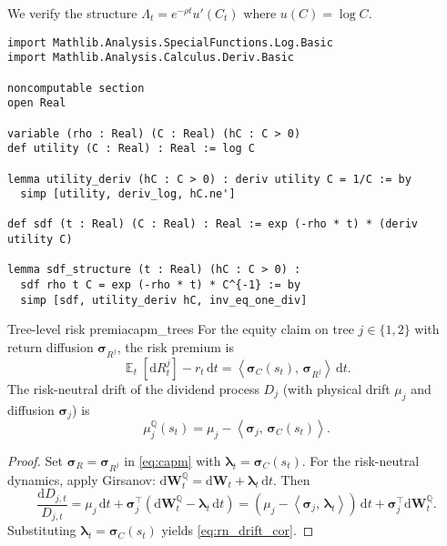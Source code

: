 ﻿\documentclass[11pt,letterpaper,oneside]{article}
\numberwithin{equation}{section}
\DeclareMathOperator{\E}{\mathbb{E}}
\newcommand{\1}{\mathbf{1}}
\newcommand{\diff}{\mathrm{d}}
\newcommand{\ip}[2]{\left\langle #1,\,#2\right\rangle}
\begin{document}
\begin{leanproof}[title={Structural Definition: Log-Utility SDF}]
We verify the structure $\Lambda_t = e^{-\rho t} u'(C_t)$ where $u(C) = \log C$.
\begin{lstlisting}[language={},basicstyle=\ttfamily\small]
import Mathlib.Analysis.SpecialFunctions.Log.Basic
import Mathlib.Analysis.Calculus.Deriv.Basic

noncomputable section
open Real

variable (rho : Real) (C : Real) (hC : C > 0)
def utility (C : Real) : Real := log C

lemma utility_deriv (hC : C > 0) : deriv utility C = 1/C := by
  simp [utility, deriv_log, hC.ne']

def sdf (t : Real) (C : Real) : Real := exp (-rho * t) * (deriv utility C)

lemma sdf_structure (t : Real) (hC : C > 0) :
  sdf rho t C = exp (-rho * t) * C^{-1} := by
  simp [sdf, utility_deriv hC, inv_eq_one_div]
\end{lstlisting}
\end{leanproof}

\begin{corollary}{Tree-level risk premia}{capm_trees}
For the equity claim on tree $j\in\{1,2\}$ with return diffusion $\bm{\sigma}_{R^j}$, the risk premium is
\begin{equation}\label{eq:tree_capm}
  \E_t[\diff R^j_t]-r_t\,\diff t=\ip{\bm{\sigma}_C(s_t)}{\bm{\sigma}_{R^j}}\,\diff t.
\end{equation}
The risk-neutral drift of the dividend process $D_j$ (with physical drift $\mu_j$ and diffusion $\bm{\sigma}_j$) is
\begin{equation}\label{eq:rn_drift_cor}
  \mu_j^{\mathbb{Q}}(s_t)=\mu_j-\ip{\bm{\sigma}_j}{\bm{\sigma}_C(s_t)}.
\end{equation}
\end{corollary}
\begin{proof}
Set $\bm{\sigma}_R=\bm{\sigma}_{R^j}$ in \eqref{eq:capm} with $\bm{\lambda}_t=\bm{\sigma}_C(s_t)$. For the risk-neutral dynamics, apply Girsanov: $\diff\bm{W}_t^{\mathbb{Q}}=\diff\bm{W}_t+\bm{\lambda}_t\,\diff t$. Then
\[
  \frac{\diff D_{j,t}}{D_{j,t}}=\mu_j\,\diff t+\bm{\sigma}_j^{\top}(\diff\bm{W}_t^{\mathbb{Q}}-\bm{\lambda}_t\,\diff t)
  = (\mu_j-\ip{\bm{\sigma}_j}{\bm{\lambda}_t})\,\diff t + \bm{\sigma}_j^{\top}\diff\bm{W}_t^{\mathbb{Q}}.
\]
Substituting $\bm{\lambda}_t=\bm{\sigma}_C(s_t)$ yields \eqref{eq:rn_drift_cor}.
\end{proof}
\end{document}
